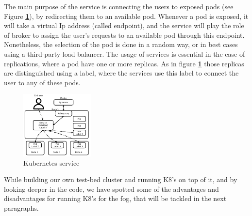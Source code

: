 \documentclass[letterpaper,twocolumn,10pt]{article}
\let\origref\ref
\def\ref#1{\textbf{\origref{#1}}}
\begin{document}
The main purpose of the service is connecting the users to exposed pods (see Figure \ref{fig:svc}), by redirecting them to an available pod. Whenever a pod is exposed, it will take a virtual Ip address (called endpoint), and the service will play the role of broker to assign the user's requests to an available pod through this endpoint. Nonetheless, the selection of the pod is done in a random way, or in best cases using a third-party load balancer. The usage of services is essential in the case of replications, where a pod have one or more replicas. As in figure \ref{fig:svc} those replicas are distinguished using a label, where the services use this label to connect the user to any of these pods.    
\begin{figure}[t]
\centering\includegraphics[width=0.33\textwidth]{images/svc.png}
\caption{Kubernetes service}
\label{fig:svc}
\end{figure}

While building our own test-bed cluster and running K8's on top of it, and by looking deeper in the code, we have spotted some of the advantages and disadvantages for running K8's for the fog, that will be tackled in the next paragraphs.
\end{document}
